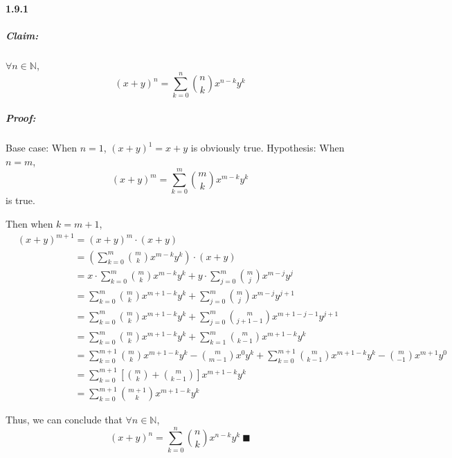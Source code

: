 \documentclass[11pt]{article}
\begin{document}
	\paragraph{1.9.1}
		\subparagraph{Claim:} $\forall n \in \mathbb{N}$, 
			\[(x + y)^n = \sum_{k = 0}^n \binom{n}{k}x^{n-k}y^{k}\]
		\subparagraph{Proof:}
		Base case: When $n = 1$, $(x + y)^1 = x + y$ is obviously true. 
		Hypothesis: When $n = m$, \[(x + y)^m = \sum_{k = 0}^m \binom{m}{k}x^{m-k}y^{k}\]
		is true.
		
		Then when $k = m + 1$, 
		\begin{align}
			&(x + y)^{m + 1} = (x + y)^m \cdot (x + y)\nonumber\\
			&\phantom{(x + y)^{m + 1}} = (\sum_{k = 0}^{m} \binom{m}{k}x^{m - k}y^{k}) \cdot (x + y)\nonumber\\
			&\phantom{(x + y)^{m + 1}} = x \cdot \sum_{k = 0}^{m} \binom{m}{k}x^{m - k}y^{k} + y \cdot \sum_{j = 0}^{m} \binom{m}{j}x^{m - j}y^{j}\nonumber\\
			&\phantom{(x + y)^{m + 1}} = \sum_{k = 0}^{m} \binom{m}{k}x^{m + 1 - k}y^{k} + \sum_{j = 0}^{m} \binom{m}{j}x^{m - j}y^{j + 1}\nonumber\\
			&\phantom{(x + y)^{m + 1}} = \sum_{k = 0}^{m} \binom{m}{k}x^{m + 1 - k}y^{k} + \sum_{j = 0}^{m} \binom{m}{j + 1 - 1}x^{m + 1 - j - 1}y^{j + 1}\nonumber\\
			&\phantom{(x + y)^{m + 1}} = \sum_{k = 0}^{m} \binom{m}{k}x^{m + 1 - k}y^{k} + \sum_{k = 1}^{m} \binom{m}{k - 1}x^{m + 1 - k}y^{k}\nonumber\\
			&\phantom{(x + y)^{m + 1}} = \sum_{k = 0}^{m + 1} \binom{m}{k}x^{m + 1 - k}y^{k} - \binom{m}{m - 1} x^0y^k + \sum_{k = 0}^{m+1} \binom{m}{k-1}x^{m + 1 - k}y^{k} - \binom{m}{-1}x^{m+1}y^0\nonumber\\
			&\phantom{(x + y)^{m + 1}} = \sum_{k = 0}^{m+1}[\binom{m}{k} + \binom{m}{k - 1}]x^{m+1-k}y^k\nonumber\\
			&\phantom{(x + y)^{m + 1}} = \sum_{k = 0}^{m+1}\binom{m+1}{k}x^{m+1-k}y^k\nonumber
		\end{align}
		
		Thus, we can conclude that $\forall n \in \mathbb{N}$, 
			\[(x + y)^n = \sum_{k = 0}^n \binom{n}{k}x^{n-k}y^{k}\ \blacksquare\]
\end{document}
